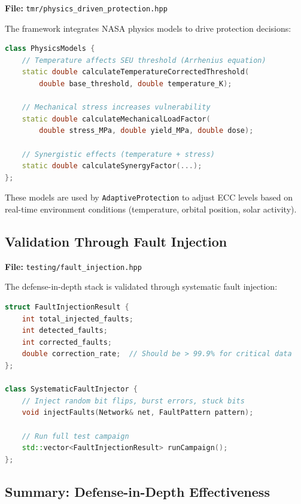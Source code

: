 \documentclass[11pt,a4paper]{article}
\begin{document}
\textbf{File:} \texttt{tmr/physics\_driven\_protection.hpp}

The framework integrates NASA physics models to drive protection decisions:

\begin{lstlisting}[language=C++, basicstyle=\footnotesize\ttfamily]
class PhysicsModels {
    // Temperature affects SEU threshold (Arrhenius equation)
    static double calculateTemperatureCorrectedThreshold(
        double base_threshold, double temperature_K);

    // Mechanical stress increases vulnerability
    static double calculateMechanicalLoadFactor(
        double stress_MPa, double yield_MPa, double dose);

    // Synergistic effects (temperature + stress)
    static double calculateSynergyFactor(...);
};
\end{lstlisting}

These models are used by \texttt{AdaptiveProtection} to adjust ECC levels based on real-time environment conditions (temperature, orbital position, solar activity).

\subsection{Validation Through Fault Injection}

\textbf{File:} \texttt{testing/fault\_injection.hpp}

The defense-in-depth stack is validated through systematic fault injection:

\begin{lstlisting}[language=C++, basicstyle=\footnotesize\ttfamily]
struct FaultInjectionResult {
    int total_injected_faults;
    int detected_faults;
    int corrected_faults;
    double correction_rate;  // Should be > 99.9% for critical data
};

class SystematicFaultInjector {
    // Inject random bit flips, burst errors, stuck bits
    void injectFaults(Network& net, FaultPattern pattern);

    // Run full test campaign
    std::vector<FaultInjectionResult> runCampaign();
};
\end{lstlisting}

\subsection{Summary: Defense-in-Depth Effectiveness}
\end{document}

